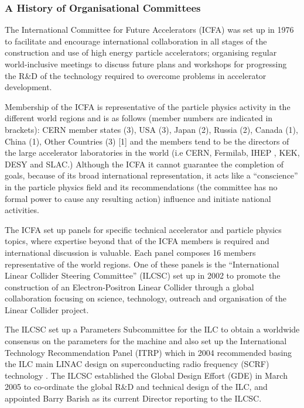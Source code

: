 \subsubsection{A History of Organisational Committees}

The International Committee for Future Accelerators (ICFA) was set up in 1976 to facilitate and encourage international collaboration in all stages of the construction and use of high energy particle accelerators; organising regular world-inclusive meetings to discuss future plans and workshops for progressing the R\&D of the technology required to overcome problems in accelerator development. \cite{ICFA}

Membership of the ICFA is representative of the particle physics activity in the different world regions and is as follows (member numbers are indicated in brackets): CERN member states (3), USA (3), Japan (2), Russia (2), Canada (1), China (1), Other Countries (3)  [1] and the members tend to be the directors of the large accelerator laboratories in the world (i.e CERN, Fermilab, IHEP , KEK, DESY and SLAC.) Although the ICFA it cannot guarantee the completion of goals, because of its broad international representation, it acts like a ``conscience'' in the particle physics field and its recommendations (the committee has no formal power to cause any resulting action) influence and initiate national activities. \cite{ICFA}

The ICFA set up panels for specific technical accelerator and particle physics topics, where expertise beyond that of the ICFA members is required and international discussion is valuable. Each panel composes 16 members representative of the world regions. One of these panels is the ``International Linear Collider Steering Committee'' (ILCSC) set up in 2002 to promote the construction of an Electron-Positron Linear Collider through a global collaboration focusing on science, technology, outreach and organisation of the Linear Collider project. \cite{ICFA}

The ILCSC set up a Parameters Subcommittee for the ILC to obtain a worldwide consensus on the parameters for the machine and also set up the International Technology Recommendation Panel (ITRP) which in 2004 recommended basing the ILC main LINAC design on superconducting radio frequency (SCRF) technology \cite{Funding:Interactions:ICFAPress}. The ILCSC established the Global Design Effort (GDE) in March 2005 to co-ordinate the global R\&D and technical design of the ILC, and appointed Barry Barish as its current Director reporting to the ILCSC.

